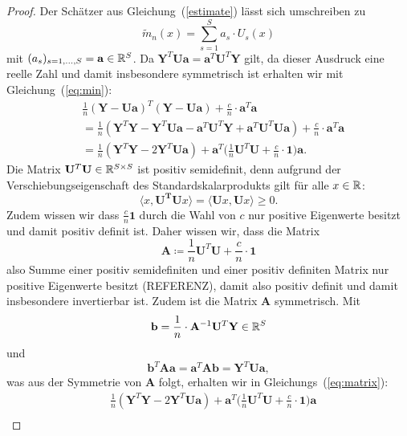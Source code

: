 \begin{proof}
Der Schätzer aus Gleichung~(\ref{estimate}) lässt sich umschreiben zu 
\begin{equation}
\label{umschreiben}
\tilde{m}_n(x) = \sum_{s = 1}^S a_s \cdot U_s(x)
\end{equation}
mit $(a_s)_{s = 1,\dots,S} = \mathbf{a}\in \mathbb{R}^S$. Da $\mathbf{Y}^T\mathbf{U}\mathbf{a} = \mathbf{a}^T\mathbf{U}^T\mathbf{Y}$ gilt, da dieser Ausdruck eine reelle Zahl und damit insbesondere symmetrisch ist erhalten wir mit Gleichung~(\ref{eq:min}):
\begin{equation}
\label{eq:matrix}
\begin{split}
& \frac{1}{n}(\mathbf{Y} - \mathbf{U}\mathbf{a})^T(\mathbf{Y} - \mathbf{U}\mathbf{a}) + \frac{c}{n} \cdot \mathbf{a}^T\mathbf{a} \\
& = \frac{1}{n}(\mathbf{Y}^T\mathbf{Y} - \mathbf{Y}^T\mathbf{U}\mathbf{a} - \mathbf{a}^T\mathbf{U}^T\mathbf{Y} + \mathbf{a}^T\mathbf{U}^T\mathbf{U}\mathbf{a}) + \frac{c}{n} \cdot \mathbf{a}^T\mathbf{a} \\
& = \frac{1}{n}(\mathbf{Y}^T\mathbf{Y} - 2\mathbf{Y}^T\mathbf{U}\mathbf{a}) + \mathbf{a}^T\bigg(\frac{1}{n} \mathbf{U}^T\mathbf{U} + \frac{c}{n} \cdot \mathbf{1}\bigg) \mathbf{a}.
\end{split}
\end{equation} 
Die Matrix $\mathbf{U}^T\mathbf{U} \in \mathbb{R}^{S \times S}$ ist positiv semidefinit, denn aufgrund der Verschiebungseigenschaft des Standardskalarprodukts gilt für alle $x \in \mathbb{R}$:
$$\langle x, \mathbf{U^T}\mathbf{U} x\rangle = \langle \mathbf{U} x, \mathbf{U} x\rangle \geq 0.$$
Zudem wissen wir dass $\frac{c}{n}\mathbf{1}$ durch die Wahl von $c$ nur positive Eigenwerte besitzt und damit positiv definit ist.  
Daher wissen wir, dass die Matrix
$$\mathbf{A} \coloneqq \frac{1}{n}\mathbf{U}^T\mathbf{U} + \frac{c}{n} \cdot \mathbf{1}$$ also Summe einer positiv semidefiniten und einer positiv definiten Matrix nur positive Eigenwerte besitzt (REFERENZ), damit also positiv definit und damit insbesondere invertierbar ist. Zudem ist die Matrix $\mathbf{A}$ symmetrisch. 
Mit $$\mathbf{b} = \frac{1}{n} \cdot \mathbf{A}^{-1}\mathbf{U}^T\mathbf{Y} \in \mathbb{R}^S$$ und $$\mathbf{b}^T\mathbf{A}\mathbf{a} = \mathbf{a}^T\mathbf{A}\mathbf{b} = \mathbf{Y}^T\mathbf{U}\mathbf{a},$$ was aus der Symmetrie von $\mathbf{A}$ folgt, erhalten wir in Gleichungs~(\ref{eq:matrix}):
\begin{equation*}
\begin{split}
& \frac{1}{n}(\mathbf{Y}^T\mathbf{Y} - 2\mathbf{Y}^T\mathbf{U}\mathbf{a}) + \mathbf{a}^T\bigg(\frac{1}{n} \mathbf{U}^T\mathbf{U} + \frac{c}{n} \cdot \mathbf{1}\bigg) \mathbf{a} \\

\end{split}
\end{equation*}
\end{proof}
